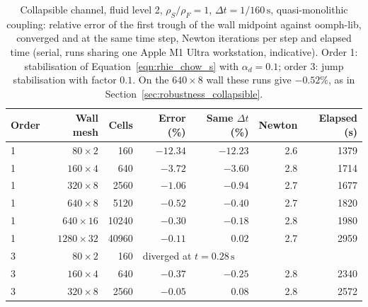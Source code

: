 \begin{table}[htbp]
	\centering
	\footnotesize
	\setlength{\tabcolsep}{3pt}
	\caption{Collapsible channel, fluid level 2, $\rho_S/\rho_F = 1$, $\Delta t = 1/160\,\mathrm{s}$, quasi-monolithic coupling: relative error of the first trough of the wall midpoint against oomph-lib, converged and at the same time step, Newton iterations per step and elapsed time (serial, runs sharing one Apple M1 Ultra workstation, indicative). Order 1: stabilisation of Equation~\eqref{eqn:rhie_chow_s} with $\alpha_d = 0.1$; order 3: jump stabilisation with factor $0.1$. On the $640\times8$ wall these runs give $-0.52\%$, as in Section~\ref{sec:robustness_collapsible}.}
	\label{tab:ho_collapsible}
	\begin{tabular}{lrrrrrr}
		\toprule
		Order & Wall mesh & Cells & Error (\%) & Same $\Delta t$ (\%) & Newton & Elapsed (s) \\
		\midrule
		1 & $80\times2$    & 160    & $-12.34$ & $-12.23$ & 2.6 & 1379 \\
		1 & $160\times4$   & 640    & $-3.72$  & $-3.60$  & 2.8 & 1714 \\
		1 & $320\times8$   & 2560   & $-1.06$  & $-0.94$  & 2.7 & 1677 \\
		1 & $640\times8$   & 5120   & $-0.52$  & $-0.40$  & 2.7 & 1820 \\
		1 & $640\times16$  & 10240  & $-0.30$  & $-0.18$  & 2.8 & 1980 \\
		1 & $1280\times32$ & 40960  & $-0.11$  & $0.02$   & 2.7 & 2959 \\
		3 & $80\times2$    & 160    & \multicolumn{4}{l}{diverged at $t = 0.28\,\mathrm{s}$} \\
		3 & $160\times4$   & 640    & $-0.37$  & $-0.25$  & 2.8 & 2340 \\
		3 & $320\times8$   & 2560   & $-0.05$  & $0.08$   & 2.8 & 2572 \\
		\bottomrule
	\end{tabular}
\end{table}

